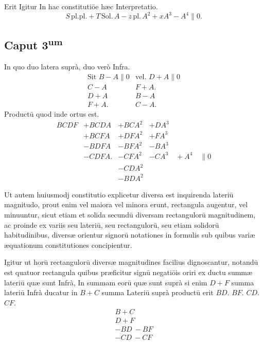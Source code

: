 \documentclass[11pt,a4paper]{article}
\begin{document}
Erit Igitur In hac constitutiōe hæc Interpretatio.
\[ S\,\mathrm{pl.pl.} + T\,\mathrm{Sol.}\,A - z\,\mathrm{pl.}\,A^{2} + xA^{3} - A^{4} \parallel 0. \]

\subsection*{Caput 3\textsuperscript{um}}

In quo duo latera suprà, duo verò Infra.
\[ \begin{array}{ll} \text{Sit } B - A \parallel 0 & \text{vel. } D + A \parallel 0 \\ C - A & F + A. \\ D + A & B - A \\ F + A. & C - A. \end{array} \]
Productū quod inde ortus est.
\[ \begin{array}{llll} BCDF & + BCDA & + BCA^{2} & + DA^{3} \\ & + BCFA & + DFA^{2} & + FA^{3} \\ & - BDFA & - BFA^{2} & - BA^{3} \\ & - CDFA. & - CFA^{2} & - CA^{3} \quad + A^{4} \quad \parallel 0 \\ & & - CDA^{2} & \\ & & - BDA^{2} & \end{array} \]


Ut autem huiusmodj constitutio explicetur diversa est inquirenda lateriū magnitudo, prout enim vel maiora vel minora erunt, rectangula augentur, vel minuuntur, sicut etiam et solida secundū diversam rectangulorū magnitudinem, ac proinde ex variis seu lateriū, seu rectangulorū, seu etiam solidorū habitudinibus, diversæ orientur signorū notationes in formulis sub quibus variæ æquationum constitutiones concipientur.

Igitur ut horū rectangulorū diversæ magnitudines facilius dignoscantur, notandū est quatuor rectangula quibus præficitur signū negatiōis oriri ex ductu summæ lateriū quæ sunt Infrà, In summam eorū quæ sunt suprà si enim $D + F$ summa lateriū Infrà ducatur in $B + C$ summa Lateriū suprà productū erit $BD$. $BF$. $CD$. $CF$.
\[ \begin{array}{l} B + C \\ D + F \\ \hline -BD\ -BF \\ -CD\ -CF \end{array} \]
\end{document}
